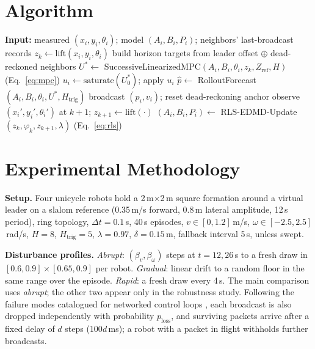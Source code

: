 \documentclass[10pt,conference]{IEEEtran}
\begin{document}
\section{Algorithm}

\begin{algorithmic}[1]
\STATE \textbf{Input:} measured $(x_i,y_i,\theta_i)$; model $(A_i,B_i,P_i)$; neighbors' last-broadcast records
\STATE $z_k \gets \mathrm{lift}(x_i,y_i,\theta_i)$
\STATE build horizon targets from leader offset $\oplus$ dead-reckoned neighbors
\STATE $U^* \gets$ SuccessiveLinearizedMPC$(A_i,B_i,\theta_i,z_k,Z_{\mathrm{ref}},H)$ \hfill (Eq.~\ref{eq:mpc})
\STATE $u_i \gets \mathrm{saturate}(U^*_0)$; apply $u_i$
  \STATE $\hat p \gets$ RolloutForecast$(A_i,B_i,\theta_i,U^*,H_{\mathrm{trig}})$
\ENDIF
{}
  \STATE broadcast $(p_i,v_i)$; reset dead-reckoning anchor
\ENDIF
\STATE observe $(x_i',y_i',\theta_i')$ at $k{+}1$; $z_{k+1}\gets\mathrm{lift}(\cdot)$
\STATE $(A_i,B_i,P_i)\gets$ RLS-EDMD-Update$(z_k,\varphi_k,z_{k+1},\lambda)$ \hfill (Eq.~\ref{eq:rls})
\end{algorithmic}

\section{Experimental Methodology}

\textbf{Setup.} Four unicycle robots hold a 2\,m$\times$2\,m square formation around a virtual leader on a slalom reference (0.35\,m/s forward, 0.8\,m lateral amplitude, 12\,s period), ring topology, $\Delta t=0.1$\,s, 40\,s episodes, $v\in[0,1.2]$\,m/s, $\omega\in[-2.5,2.5]$\,rad/s, $H=8$, $H_{\mathrm{trig}}=5$, $\lambda=0.97$, $\delta=0.15$\,m, fallback interval 5\,s, unless swept.

\textbf{Disturbance profiles.} \emph{Abrupt}: $(\beta_v,\beta_\omega)$ steps at $t=12,26$\,s to a fresh draw in $[0.6,0.9]\times[0.65,0.9]$ per robot. \emph{Gradual}: linear drift to a random floor in the same range over the episode. \emph{Rapid}: a fresh draw every 4\,s. The main comparison uses \emph{abrupt}; the other two appear only in the robustness study. Following the failure modes catalogued for networked control loops \cite{hespanha2007}, each broadcast is also dropped independently with probability $p_{\mathrm{loss}}$, and surviving packets arrive after a fixed delay of $d$ steps ($100d$\,ms); a robot with a packet in flight withholds further broadcasts.
\end{document}
